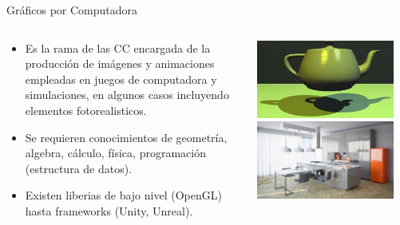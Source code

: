 
\begin{frame}{Gráficos por Computadora}
\begin{columns}
\begin{column}{0.58\textwidth}
    \begin{center}

\begin{itemize}
\item Es la rama de las CC encargada de la producción de imágenes y animaciones empleadas en juegos de computadora y simulaciones, en algunos casos incluyendo elementos fotorealisticos.
\item Se requieren conocimientos de geometría, algebra, cálculo, física, programación (estructura de datos). 
\item Existen liberias de bajo nivel (OpenGL) hasta frameworks (Unity, Unreal).
\end{itemize}
     \end{center}

\end{column}
\begin{column}{0.42\textwidth}  
    \begin{center}
     \includegraphics[width=0.9\textwidth]{Figs/GC1}\\
     \includegraphics[width=0.9\textwidth]{Figs/GC2}\\
     \end{center}
\end{column}
\end{columns}
\end{frame}

